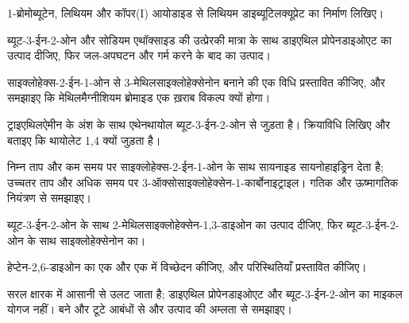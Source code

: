\begin{exercise}[$\star$]\label{exo:b2:conjugate-additions:3}
1-ब्रोमोब्यूटेन, लिथियम और कॉपर(I) आयोडाइड से लिथियम डाइब्यूटिलक्यूप्रेट का निर्माण लिखिए।
\end{exercise}

\begin{exercise}[$\star$]\label{exo:b2:conjugate-additions:4}
ब्यूट-3-ईन-2-ओन और सोडियम एथॉक्साइड की उत्प्रेरकी मात्रा के साथ डाइएथिल प्रोपेनडाइओएट का उत्पाद दीजिए,
फिर जल-अपघटन और गर्म करने के बाद का उत्पाद।
\end{exercise}

\begin{exercise}[$\star\star$]\label{exo:b2:conjugate-additions:5}
साइक्लोहेक्स-2-ईन-1-ओन से 3-मेथिलसाइक्लोहेक्सेनोन बनाने की एक विधि प्रस्तावित कीजिए, और समझाइए कि
मेथिलमैग्नीशियम ब्रोमाइड एक ख़राब विकल्प क्यों होगा।
\end{exercise}

\begin{exercise}[$\star\star$]\label{exo:b2:conjugate-additions:6}
ट्राइएथिलऐमीन के अंश के साथ एथेनथायोल ब्यूट-3-ईन-2-ओन से जुड़ता है। क्रियाविधि लिखिए और बताइए कि
थायोलेट 1,4 क्यों जुड़ता है।
\end{exercise}

\begin{exercise}[$\star\star$]\label{exo:b2:conjugate-additions:7}
निम्न ताप और कम समय पर साइक्लोहेक्स-2-ईन-1-ओन के साथ सायनाइड सायनोहाइड्रिन देता है; उच्चतर
ताप और अधिक समय पर 3-ऑक्सोसाइक्लोहेक्सेन-1-कार्बोनाइट्राइल। गतिक और ऊष्मागतिक
नियंत्रण से समझाइए।
\end{exercise}

\begin{exercise}[$\star\star$]\label{exo:b2:conjugate-additions:8}
ब्यूट-3-ईन-2-ओन के साथ 2-मेथिलसाइक्लोहेक्सेन-1,3-डाइओन का  उत्पाद दीजिए, फिर
ब्यूट-3-ईन-2-ओन के साथ साइक्लोहेक्सेनोन का।
\end{exercise}

\begin{exercise}[$\star\star$]\label{exo:b2:conjugate-additions:9}
हेप्टेन-2,6-डाइओन का एक  और एक  में विच्छेदन कीजिए, और परिस्थितियाँ प्रस्तावित कीजिए।
\end{exercise}

\begin{exercise}[$\star\star\star$]\label{exo:b2:conjugate-additions:10}
सरल  क्षारक में आसानी से उलट जाता है; डाइएथिल प्रोपेनडाइओएट और
ब्यूट-3-ईन-2-ओन का माइकल योगज नहीं। बने और टूटे आबंधों से और उत्पाद की अम्लता से समझाइए।
\end{exercise}

